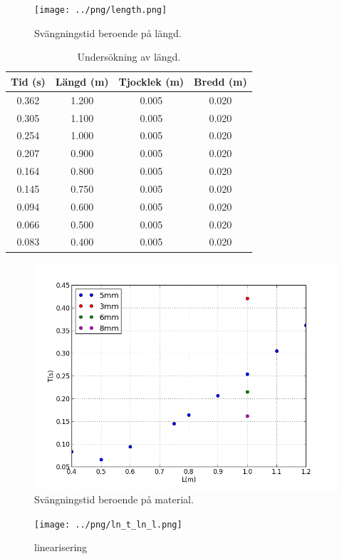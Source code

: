 \documentclass[10pt, titlepage, oneside, a4paper]{article}
\begin{document}
    \begin{figure}[H]
        \centering
        \texttt{[image: ../png/length.png]}
        \caption{Svängningstid beroende på längd.}
        \label{length}
    \end{figure}
    \begin{table}[H]
        \caption{Undersökning av längd.}
        \begin{center}
            \begin{tabular}{cccc}
                \hline
                Tid (s) & Längd (m) & Tjocklek (m) & Bredd (m)\\
                \hline
                0.362 & 1.200 & 0.005 & 0.020\\
                0.305 & 1.100 & 0.005 & 0.020\\
                0.254 & 1.000 & 0.005 & 0.020\\
                0.207 & 0.900 & 0.005 & 0.020\\
                0.164 & 0.800 & 0.005 & 0.020\\
                0.145 & 0.750 & 0.005 & 0.020\\
                0.094 & 0.600 & 0.005 & 0.020\\
                0.066 & 0.500 & 0.005 & 0.020\\
                0.083 & 0.400 & 0.005 & 0.020\\
            \end{tabular}
        \end{center}
    \end{table}
    \begin{figure}[H]
        \centering
        \includegraphics[scale=.5]{../png/plot.png}
        \caption{Svängningstid beroende på material.}
        \label{material}
    \end{figure}
    \begin{figure}[H]
        \centering
        \texttt{[image: ../png/ln\_t\_ln\_l.png]}
        \caption{linearisering}
        \label{linearisering}
    \end{figure}
\end{document}
